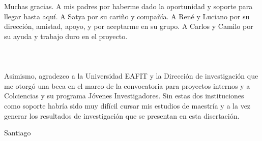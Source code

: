 


\begin{acknowledgements} 

Muchas gracias. A mis padres por haberme dado la oportunidad y soporte
para llegar hasta aquí. A Satya por su cariño y compañía. A René y Luciano por su
dirección, amistad, apoyo, y por aceptarme en su grupo. A Carlos y
Camilo por su ayuda y trabajo duro en el proyecto.\\
\\
\\
\\
Asimismo, agradezco a la Universidad EAFIT y la Dirección de
investigación que me otorgó una beca en el marco de la convocatoria
para proyectos internos y a Colciencias y su programa Jóvenes
Investigadores. Sin estas dos instituciones como soporte habría sido
muy difícil cursar mis estudios de maestría y a la vez generar los
resultados de investigación que se presentan en esta disertación. 

\begin{flushright}

Santiago

\monthname \ \the\year







\end{flushright}



\end{acknowledgements}




